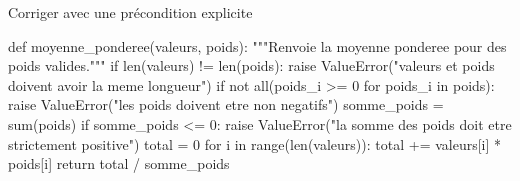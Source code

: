 
\begin{codereference}{Corriger avec une précondition explicite}
\begin{python}
def moyenne_ponderee(valeurs, poids):
    """Renvoie la moyenne ponderee pour des poids valides."""
    if len(valeurs) != len(poids):
        raise ValueError("valeurs et poids doivent avoir la meme longueur")
    if not all(poids_i >= 0 for poids_i in poids):
        raise ValueError("les poids doivent etre non negatifs")
    somme_poids = sum(poids)
    if somme_poids <= 0:
        raise ValueError("la somme des poids doit etre strictement positive")
    total = 0
    for i in range(len(valeurs)):
        total += valeurs[i] * poids[i]
    return total / somme_poids
\end{python}
\end{codereference}

